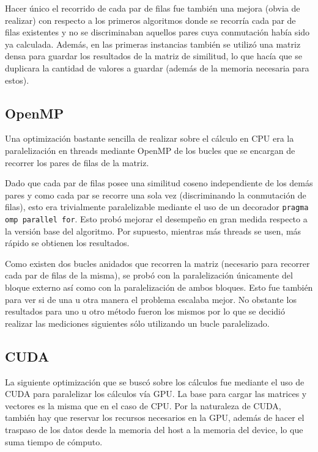 \documentclass[11pt, a4paper]{article}
\begin{document}
  Hacer único el recorrido de cada par de filas fue también una mejora (obvia
  de realizar) con respecto a los primeros algoritmos donde se recorría cada
  par de filas existentes y no se discriminaban aquellos pares cuya conmutación
  había sido ya calculada. Además, en las primeras instancias también se
  utilizó una matriz densa para guardar los resultados de la matriz de
  similitud, lo que hacía que se duplicara la cantidad de valores a guardar
  (además de la memoria necesaria para estos).

  \subsection{OpenMP}

  Una optimización bastante sencilla de realizar sobre el cálculo en CPU era la
  paralelización en threads mediante OpenMP de los bucles que se encargan de
  recorrer los pares de filas de la matriz.

  Dado que cada par de filas posee una similitud coseno independiente de los
  demás pares y como cada par se recorre una sola vez (discriminando la
  conmutación de filas), esto era trivialmente paralelizable mediante el uso de
  un decorador \texttt{pragma omp parallel for}. Esto probó mejorar el
  desempeño en gran medida respecto a la versión base del algoritmo. Por
  supuesto, mientras más threads se usen, más rápido se obtienen los
  resultados.

  Como existen dos bucles anidados que recorren la matriz (necesario para
  recorrer cada par de filas de la misma), se probó con la paralelización
  únicamente del bloque externo así como con la paralelización de ambos
  bloques. Esto fue también para ver si de una u otra manera el problema
  escalaba mejor. No obstante los resultados para uno u otro método fueron los
  mismos por lo que se decidió realizar las mediciones siguientes sólo
  utilizando un bucle paralelizado.

  \subsection{CUDA}\label{sec:optimizacion:cuda}

  La siguiente optimización que se buscó sobre los cálculos fue mediante el uso
  de CUDA para paralelizar los cálculos vía GPU. La base para cargar las
  matrices y vectores es la misma que en el caso de CPU. Por la naturaleza de
  CUDA, también hay que reservar los recursos necesarios en la GPU, además de
  hacer el traspaso de los datos desde la memoria del host a la memoria del
  device, lo que suma tiempo de cómputo.
\end{document}
